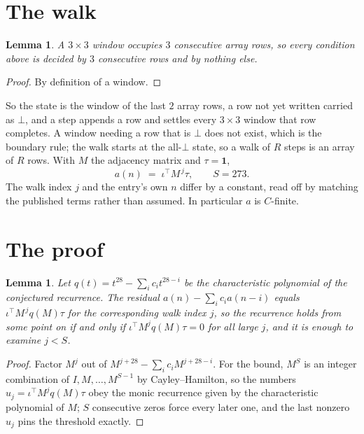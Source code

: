 \documentclass[11pt,a4paper]{article}
\theoremstyle{plain}
\newtheorem{lemma}[theorem]{Lemma}
\theoremstyle{definition}
\begin{document}
\section{The walk}

\begin{lemma}\label{lem:win}
A $3\times3$ window occupies $3$ consecutive array rows, so every condition above is
decided by $3$ consecutive rows and by nothing else.
\end{lemma}

\begin{proof}
By definition of a window.
\end{proof}

So the state is the window of the last $2$ array rows, a row not yet written carried as
$\bot$, and a step appends a row and settles every $3\times3$ window that row completes. A
window needing a row that is $\bot$ does not exist, which is the boundary rule; the walk starts
at the all-$\bot$ state, so a walk of $R$ steps is an array of $R$ rows. With $M$ the adjacency
matrix and $\tau=\mathbf{1}$,
\[
a(n)\;=\;\iota^{\!\top}M^{\,j}\tau ,\qquad S=273.
\]
The walk index $j$ and the entry's own $n$ differ by a constant, read off by matching the
published terms rather than assumed. In particular $a$ is $C$-finite.

\section{The proof}

\begin{lemma}\label{lem:crit}
Let $q(t)=t^{28}-\sum_i c_it^{28-i}$ be the characteristic polynomial of the
conjectured recurrence. The residual $a(n)-\sum_ic_ia(n-i)$ equals
$\iota^{\!\top}M^{\,j}q(M)\tau$ for the corresponding walk index $j$, so the recurrence
holds from some point on if and only if $\iota^{\!\top}M^{j}q(M)\tau=0$ for all large $j$,
and it is enough to examine $j<S$.
\end{lemma}

\begin{proof}
Factor $M^{j}$ out of $M^{j+28}-\sum_ic_iM^{j+28-i}$. For the bound, $M^{S}$
is an integer combination of $I,M,\dots,M^{S-1}$ by Cayley--Hamilton, so the numbers
$u_j=\iota^{\!\top}M^{j}q(M)\tau$ obey the monic recurrence given by the characteristic
polynomial of $M$; $S$ consecutive zeros force every later one, and the last nonzero $u_j$
pins the threshold exactly.
\end{proof}
\end{document}
